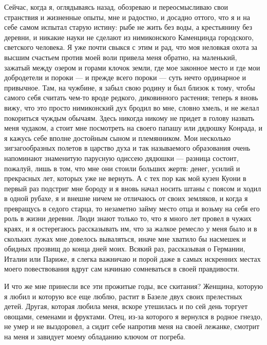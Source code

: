 Сейчас, когда  я, оглядываясь  назад, обозреваю и  переосмысливаю свои
странствия и жизненные опыты, мне и  радостно, и досадно оттого, что я
и  на себе  самом испытал  старую  истину: рыбе  не жить  без воды,  а
крестьянину без  деревни, и никакие  науки не сделают  из нимиконского
Каменцинда городского, светского человека. Я уже почти свыкся с этим и
рад,  что моя  неловкая  охота  за высшим  счастьем  против моей  воли
привела  меня обратно,  на маленький,  зажатый между  озером и  горами
клочок земли,  где мое законное место  и где мои добродетели  и пороки
--- и прежде всего пороки ---  суть нечто ординарное и привычное. Там,
на чужбине, я забыл свою родину и был близок к тому, чтобы самого себя
считать  чем-то вроде  редкого, диковинного  растения; теперь  я вновь
вижу, что это просто нимиконский дух бродил во мне, словно хмель, и не
желал  покориться чуждым  обычаям. Здесь  никогда никому  не придет  в
голову назвать меня  чудаком, а стоит мне посмотреть  на своего папашу
или  дядюшку  Конрада,  и  я  кажусь себе  вполне  достойным  сыном  и
племянником. Мои  несколько зигзагообразных  полетов в царство  духа и
так  называемого  образования  очень  напоминают  знаменитую  парусную
одиссею дядюшки --- разница состоит, пожалуй,  лишь в том, что мне они
стоили больших жертв:  денег, усилий и прекрасных лет,  которых уже не
вернуть. А  с тех пор  как мой кузен Куони  в первый раз  подстриг мне
бороду и я вновь начал носить штаны с поясом и ходил в одной рубахе, я
и внешне ничем не отличаюсь от  своих земляков, и когда я превращусь в
седого старца, то незаметно займу место отца и возьму на себя его роль
в жизни деревни. Люди знают только то,  что я много лет провел в чужих
краях, и я  остерегаюсь рассказывать им, что за жалкое  ремесло у меня
было и в скольких лужах мне  довелось вываляться, иначе мне хватило бы
насмешек и обидных прозвищ до конца дней моих. Всякий раз, рассказывая
о Германии, Италии или Париже, я  слегка важничаю и порой даже в самых
искренних местах  моего повествования вдруг сам  начинаю сомневаться в
своей правдивости.

И что  же мне принесли все  эти прожитые годы, все  скитания? Женщина,
которую я  любил и которую все  еще люблю, растит в  Базеле двух своих
прелестных детей. Другая,  которая любила меня, вскоре  утешилась и по
сей день торгует овощами, семенами  и фруктами. Отец, из-за которого я
вернулся  в родное  гнездо,  не умер  и не  выздоровел,  а сидит  себе
напротив  меня на  своей лежанке,  смотрит  на меня  и завидует  моему
обладанию ключом от погреба.

